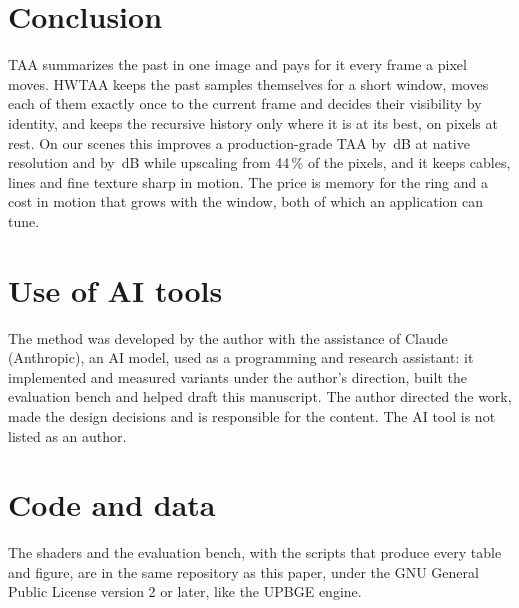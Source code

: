\documentclass[11pt,a4paper]{article}
\begin{document}
\section{Conclusion}

TAA summarizes the past in one image and pays for it every frame a pixel moves. HWTAA keeps the past samples themselves for a short window, moves each of them exactly once to the current frame and decides their visibility by identity, and keeps the recursive history only where it is at its best, on pixels at rest. On our scenes this improves a production-grade TAA by \nGainAllNat{}\,dB at native resolution and by \nGainAllQ{}\,dB while upscaling from 44\,\% of the pixels, and it keeps cables, lines and fine texture sharp in motion. The price is memory for the ring and a cost in motion that grows with the window, both of which an application can tune.

\section*{Use of AI tools}
The method was developed by the author with the assistance of Claude (Anthropic), an AI model, used as a programming and research assistant: it implemented and measured variants under the author's direction, built the evaluation bench and helped draft this manuscript. The author directed the work, made the design decisions and is responsible for the content. The AI tool is not listed as an author.

\section*{Code and data}
The shaders and the evaluation bench, with the scripts that produce every table and figure, are in the same repository as this paper, under the GNU General Public License version 2 or later, like the UPBGE engine.



\end{document}
